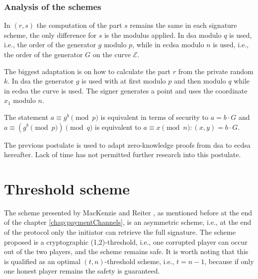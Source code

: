 \subsubsection{Analysis of the schemes}

In $(r, s)$ the computation of the part $s$ remains the same in each signature
scheme, the only difference for $s$ is the modulus applied. In \gls{dsa}
modulo $q$ is used, i.e., the order of the generator $g$ modulo $p$,  while in
\gls{ecdsa} modulo $n$ is used, i.e., the order of the generator $G$ on the
curve $\mathcal{E}$.

The biggest adaptation is on how to calculate the part $r$ from the private
random $k$. In \gls{dsa} the generator $g$ is used with at first modulo $p$
and then modulo $q$ while in \gls{ecdsa} the curve is used. The signer generates
a point and uses the coordinate $x_1$ modulo $n$.

\begin{postulate}
  The statement $a \equiv g^b \pmod p$ is equivalent in terms of security to $a = b \cdot G$
  and $a \equiv (g^b \pmod p) \pmod q$ is equivalent to $a \equiv x \pmod n : (x, y) = b \cdot G$.
  \label{post:adaptEcdsa}
\end{postulate}

The previous postulate is used to adapt zero-knowledge proofs from \gls{dsa} to
\gls{ecdsa} hereafter. Lack of time has not permitted further research into this
postulate.


\section{Threshold scheme}

The  scheme presented by MacKenzie
and Reiter \cite{crypto-2001-1592}, as mentioned before at the end of the
chapter \ref{chap:paymentChannels}, is an asymmetric scheme, i.e., at the end of
the protocol only the initiator can retrieve the full signature. The scheme
proposed is a cryptographic (1,2)-threshold, i.e., one corrupted player can
occur out of the two players, and the scheme remains safe. It is worth noting that
this is qualified as an optimal $(t, n)$-threshold scheme, i.e., $t = n - 1$,
because if only one honest player remains the safety is guaranteed.


